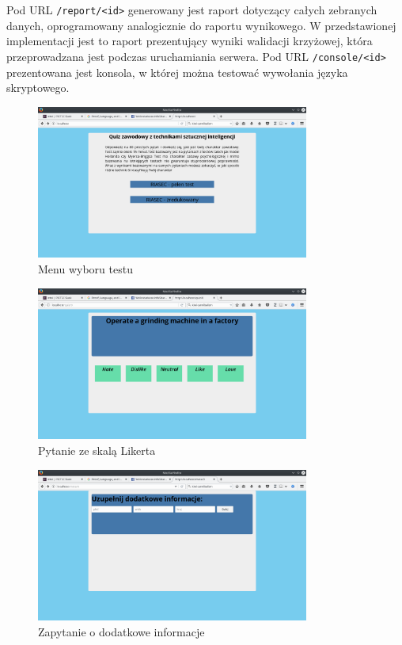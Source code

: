 \documentclass[12pt,a4paper,oneside]{report} %
\begin{document}
Pod URL \texttt{/report/<id>} generowany jest raport dotyczący całych zebranych danych, oprogramowany analogicznie do raportu wynikowego. W przedstawionej implementacji jest to raport prezentujący wyniki walidacji krzyżowej, która przeprowadzana jest podczas uruchamiania serwera. Pod URL \texttt{/console/<id>} prezentowana jest konsola, w której można testować wywołania języka skryptowego.\par

\begin{figure}
\centering
\includegraphics[width=0.8\textwidth]{4.png}
\caption{Menu wyboru testu\label{mainmenu}}
\end{figure}

\begin{figure}
\centering
\includegraphics[width=0.8\textwidth]{2.png}
\caption{Pytanie ze skalą Likerta\label{questions}}
\end{figure}

\begin{figure}
\centering
\includegraphics[width=0.8\textwidth]{3.png}
\caption{Zapytanie o dodatkowe informacje\label{additionalinfo}}
\end{figure}
\end{document}
